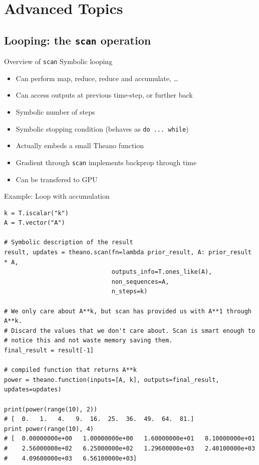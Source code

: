 \documentclass[a4paper,9pt]{beamer}
\begin{document}
\section{Advanced Topics}
\begin{frame}
  \tableofcontents[currentsection]
\end{frame}

\subsection{Looping: the {\tt scan} operation}
\begin{frame}[fragile]{Overview of {\tt scan}}
  Symbolic looping
  \begin{itemize}
    \item Can perform map, reduce, reduce and accumulate, \ldots
    \item Can access outputs at previous time-step, or further back
    \item Symbolic number of steps
    \item Symbolic stopping condition (behaves as \verb|do ... while|)
    \item Actually embeds a small Theano function
    \item Gradient through \verb|scan| implements backprop through time
    \item Can be transfered to GPU
  \end{itemize}
\end{frame}

\begin{frame}[fragile]{Example: Loop with accumulation}
  \footnotesize
    \begin{verbatim}
k = T.iscalar("k")
A = T.vector("A")

# Symbolic description of the result
result, updates = theano.scan(fn=lambda prior_result, A: prior_result * A,
                              outputs_info=T.ones_like(A),
                              non_sequences=A,
                              n_steps=k)

# We only care about A**k, but scan has provided us with A**1 through A**k.
# Discard the values that we don't care about. Scan is smart enough to
# notice this and not waste memory saving them.
final_result = result[-1]

# compiled function that returns A**k
power = theano.function(inputs=[A, k], outputs=final_result, updates=updates)

print(power(range(10), 2))
# [  0.   1.   4.   9.  16.  25.  36.  49.  64.  81.]
print power(range(10), 4)
# [  0.00000000e+00   1.00000000e+00   1.60000000e+01   8.10000000e+01
#    2.56000000e+02   6.25000000e+02   1.29600000e+03   2.40100000e+03
#    4.09600000e+03   6.56100000e+03]
  \end{verbatim}
\end{frame}
\end{document}
